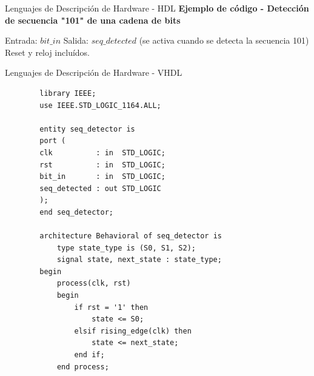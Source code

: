 \documentclass[11pt]{beamer}
\begin{document}
	\begin{frame}{Lenguajes de Descripción de Hardware - HDL}
	\textbf{Ejemplo de código - Detección de secuencia "101" de una cadena de bits} \newline
		
	Entrada: $bit\_in$ \newline
	Salida: $seq\_detected$ (se activa cuando se detecta la secuencia 101) \newline
	Reset y reloj incluídos.
	
		
	\end{frame}
	
	
	\begin{frame}[fragile]{Lenguajes de Descripción de Hardware - VHDL}
		\begin{lstlisting}
		library IEEE;
		use IEEE.STD_LOGIC_1164.ALL;
		
		entity seq_detector is
		port (
		clk          : in  STD_LOGIC;
		rst          : in  STD_LOGIC;
		bit_in       : in  STD_LOGIC;
		seq_detected : out STD_LOGIC
		);
		end seq_detector;
		
		architecture Behavioral of seq_detector is
			type state_type is (S0, S1, S2);
			signal state, next_state : state_type;
		begin
			process(clk, rst)
			begin
				if rst = '1' then
					state <= S0;
				elsif rising_edge(clk) then
					state <= next_state;
				end if;
			end process;
		\end{lstlisting}
	\end{frame}
	
\end{document}
